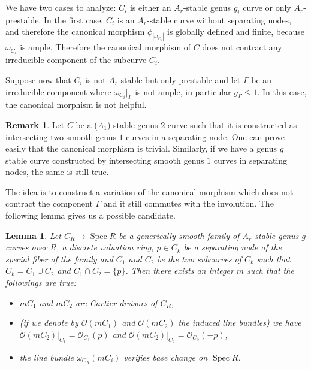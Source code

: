 \documentclass{alggeom}
\numberwithin{equation}{section}
\numberwithin{subsection}{section}
\newtheorem{lemma}[theorem]{Lemma}
\theoremstyle{definition}
\newtheorem{remark}[theorem]{Remark}
\theoremstyle{remark}
\newcommand\cO{\mathcal{O}} \newcommand\cP{\mathcal{P}}
\newcommand\spec{\operatorname{Spec}}
\begin{document}
We have two cases to analyze: $C_i$ is either an $A_r$-stable genus $g_i$ curve or only $A_r$-prestable. In the first case, $C_i$ is an $A_r$-stable curve without separating nodes, and therefore the canonical morphism $\phi_{|\omega_{C_i}|}$ is globally defined and finite, because $\omega_{C_i}$ is ample. Therefore the canonical morphism of $C$ does not contract any irreducible component of the subcurve $C_i$. 

Suppose now that $C_i$ is not $A_r$-stable but only prestable and let $\Gamma$ be an irreducible component where $\omega_{C_i}\vert_{\Gamma}$ is not ample, in particular $g_{\Gamma}\leq 1$. In this case, the canonical morphism is not helpful.

\begin{remark}
	Let $C$ be a ($A_1$)-stable genus $2$ curve such that it is constructed as intersecting two smooth genus $1$ curves in a separating node. One can prove easily that the canonical morphism is trivial. Similarly, if we have a genus $g$ stable curve constructed by intersecting smooth genus $1$ curves in separating nodes, the same is still true.
\end{remark}
 
The idea is to construct a variation of the canonical morphism which does not contract the component $\Gamma$ and it still commutes with the involution. The following lemma gives us a possible candidate.

\begin{lemma}\label{lem:var-can}
	Let $C_R\rightarrow \spec R$ be a generically smooth family of $A_r$-stable genus $g$ curves over $R$, a discrete valuation ring, $p \in C_k$ be a separating node of the special fiber of the family and $C_1$ and $C_2$ be the two subcurves of $C_k$ such that $C_k=C_1\cup C_2$ and $C_1\cap C_2=\{p\}$.  Then there exists an integer $m$ such that the followings are true:
	\begin{itemize}
		\item[(i)] $mC_1$ and $mC_2$ are Cartier divisors of $C_R$,
		\item[(ii)] (if we denote by $\cO(mC_1)$ and $\cO(mC_2)$ the induced line bundles) we have $\cO(mC_2)\vert_{C_1}=\cO_{C_1}(p)$  and $\cO(mC_2) \vert_{C_2}=\cO_{C_2}(-p)$, \item[(iii)] the line bundle $\omega_{C_R}(mC_i)$ verifies base change on $\spec R$.
	\end{itemize}
\end{lemma} 
\end{document}
